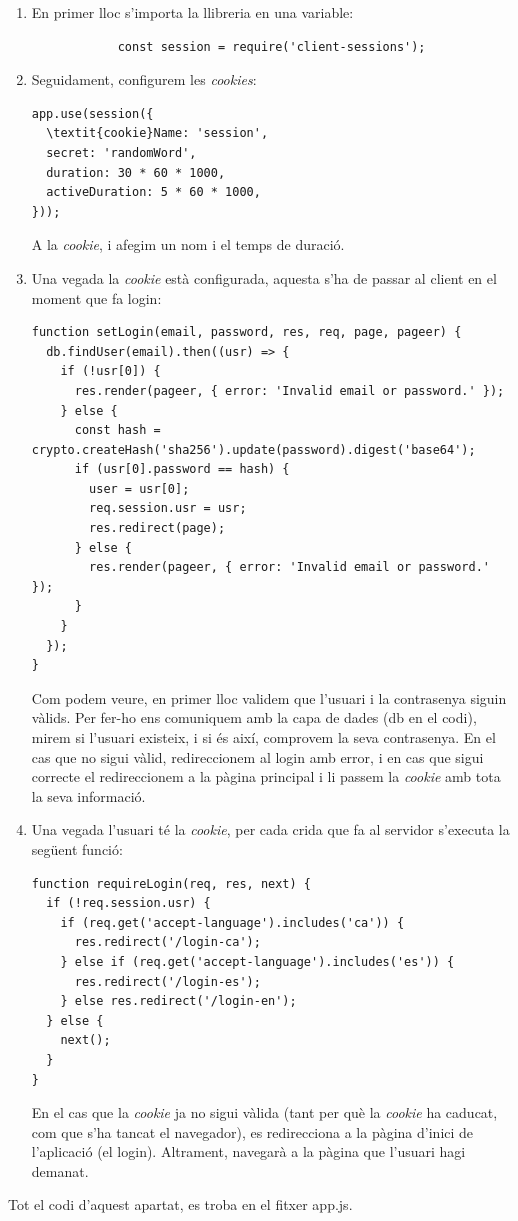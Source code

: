 \documentclass[11pt,catalan,listoffigures,listoftables]{tfgetsinf}
\begin{document}
\begin{enumerate}
	\item En primer lloc s'importa la llibreria en una variable:
		\begin{lstlisting}
			const session = require('client-sessions');
		\end{lstlisting}
	\item Seguidament, configurem les \textit{cookies}:
\begin{lstlisting}
app.use(session({
  \textit{cookie}Name: 'session',
  secret: 'randomWord',
  duration: 30 * 60 * 1000,
  activeDuration: 5 * 60 * 1000,
}));	
\end{lstlisting}
A la \textit{cookie}, i afegim un nom i el temps de duració.
\newpage
\item Una vegada la \textit{cookie} està configurada, aquesta s'ha de passar al client en el moment que fa login:
\begin{lstlisting}
function setLogin(email, password, res, req, page, pageer) {
  db.findUser(email).then((usr) => {
    if (!usr[0]) {
      res.render(pageer, { error: 'Invalid email or password.' });
    } else {
      const hash = crypto.createHash('sha256').update(password).digest('base64');
      if (usr[0].password == hash) {
        user = usr[0];
        req.session.usr = usr;
        res.redirect(page);
      } else {
        res.render(pageer, { error: 'Invalid email or password.' });
      }
    }
  });
}
\end{lstlisting}
Com podem veure, en primer lloc validem que l'usuari i la contrasenya siguin vàlids. Per fer-ho ens comuniquem amb la capa de dades (db en el codi), mirem si l'usuari existeix, i si és així, comprovem la seva contrasenya. En el cas que no sigui vàlid, redireccionem al login amb error, i en cas que sigui correcte el redireccionem a la pàgina principal i li passem la \textit{cookie} amb tota la seva informació.
\item Una vegada l'usuari té la \textit{cookie}, per cada crida que fa al servidor s'executa la següent funció:
\begin{lstlisting}
function requireLogin(req, res, next) {
  if (!req.session.usr) {
    if (req.get('accept-language').includes('ca')) {
      res.redirect('/login-ca');
    } else if (req.get('accept-language').includes('es')) {
      res.redirect('/login-es');  
    } else res.redirect('/login-en');
  } else {
    next();
  }
}
\end{lstlisting}
En el cas que la \textit{cookie} ja no sigui vàlida (tant per què la \textit{cookie} ha caducat, com que s'ha tancat el navegador), es redirecciona a la pàgina d'inici de l'aplicació (el login). Altrament, navegarà a la pàgina que l'usuari hagi demanat.
\end{enumerate}
Tot el codi d'aquest apartat, es troba en el fitxer app.js.
\newpage
\end{document}
